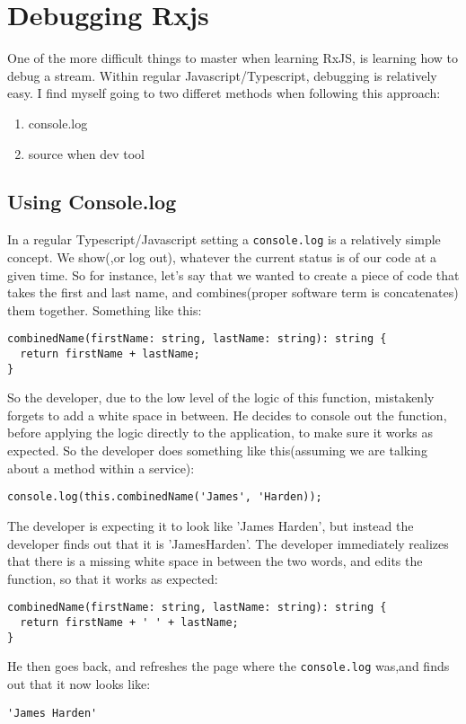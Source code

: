 \chapter{ Debugging Rxjs }
One of the more difficult things to master when learning RxJS, is learning how to debug a stream. Within regular Javascript/Typescript, debugging is relatively easy. I find myself going to two differet methods when following this approach: 
\begin{enumerate}
  \item console.log
  \item source when dev tool
\end{enumerate}

\section{Using Console.log}
In a regular Typescript/Javascript setting a \lstinline{console.log} is a relatively simple concept. We show(,or log out), whatever the current status is of our code at a given time. So for instance, let's say that we wanted to create a piece of code that takes the first and last name, and combines(proper software term is concatenates) them together. Something like this: 
\begin{lstlisting}[caption=console in action]
combinedName(firstName: string, lastName: string): string {
  return firstName + lastName;
}
\end{lstlisting}

So the developer, due to the low level of the logic of this function, mistakenly forgets to add a white space in between. He decides to console out the function, before applying the logic directly to the application, to make sure it works as expected. So the developer does something like this(assuming we are talking about a method within a service): 
\begin{lstlisting}
console.log(this.combinedName('James', 'Harden));
\end{lstlisting}

The developer is expecting it to look like 'James Harden', but instead the developer finds out that it is 'JamesHarden'. The developer immediately realizes that there is a missing white space in between the two words, and edits the function, so that it works as expected: 

\begin{lstlisting}
combinedName(firstName: string, lastName: string): string {
  return firstName + ' ' + lastName;
} 
\end{lstlisting}
He then goes back, and refreshes the page where the \lstinline{console.log} was,and finds out that it now looks like: 
\begin{verbatim}
'James Harden'  
\end{verbatim}

